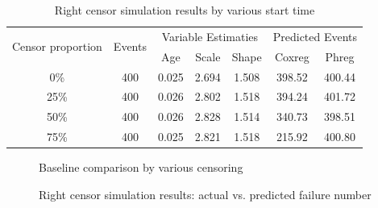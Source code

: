 \documentclass[12pt,letterpaper]{article}
\begin{document}
\begin{table}[htbp]
	\renewcommand{\arraystretch}{1.5}
	\centering
	\caption{Right censor simulation results by various start time}
	\begin{tabular}{ccccccc}
		\toprule
    	\multicolumn{1}{c}{\multirow{2}{1.5cm}{Censor proportion}}  & \multirow{2}[4]{*}{Events} & \multicolumn{3}{c}{Variable Estimaties} & \multicolumn{2}{c}{Predicted Events} \\ \cline{3-7}
		     &       & Age   & Scale & Shape & Coxreg & Phreg \\
		\midrule
		0\%   & 400   & 0.025 & 2.694 & 1.508 & 398.52 & 400.44 \\
		25\%  & 400   & 0.026 & 2.802 & 1.518 & 394.24 & 401.72 \\
		50\%  & 400   & 0.026 & 2.828 & 1.514 & 340.73 & 398.51 \\
		75\%  & 400   & 0.025 & 2.821 & 1.518 & 215.92 & 400.80 \\
		\bottomrule
	\end{tabular}%
	\label{tab:right2}%
\end{table}%


\begin{figure}[h!]
	\centering
	\quad
	\quad
	\quad
	\caption{Baseline comparison by various censoring}
	\label{fig:rightbase}
\end{figure}

\begin{figure}[h!]
	\centering
	\quad
	\quad
	\quad
	\caption{Right censor simulation results: actual vs. predicted failure number}
	\label{fig:rightcensored}
\end{figure}
\end{document}
